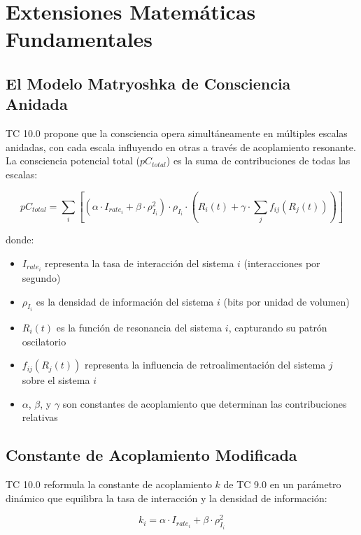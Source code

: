 \documentclass[12pt]{article}
\begin{document}
\section{Extensiones Matemáticas Fundamentales}

\subsection{El Modelo Matryoshka de Consciencia Anidada}

TC 10.0 propone que la consciencia opera simultáneamente en múltiples escalas anidadas, con cada escala influyendo en otras a través de acoplamiento resonante. La consciencia potencial total ($pC_{total}$) es la suma de contribuciones de todas las escalas:

\begin{equation}
pC_{total} = \sum_{i} [(\alpha \cdot I_{rate_i} + \beta \cdot \rho_{I_i}^2) \cdot \rho_{I_i} \cdot (R_i(t) + \gamma \cdot \sum_{j} f_{ij}(R_j(t)))]
\end{equation}

donde:
\begin{itemize}
    \item $I_{rate_i}$ representa la tasa de interacción del sistema $i$ (interacciones por segundo)
    \item $\rho_{I_i}$ es la densidad de información del sistema $i$ (bits por unidad de volumen)
    \item $R_i(t)$ es la función de resonancia del sistema $i$, capturando su patrón oscilatorio
    \item $f_{ij}(R_j(t))$ representa la influencia de retroalimentación del sistema $j$ sobre el sistema $i$
    \item $\alpha$, $\beta$, y $\gamma$ son constantes de acoplamiento que determinan las contribuciones relativas
\end{itemize}

\subsection{Constante de Acoplamiento Modificada}

TC 10.0 reformula la constante de acoplamiento $k$ de TC 9.0 en un parámetro dinámico que equilibra la tasa de interacción y la densidad de información:

\begin{equation}
k_i = \alpha \cdot I_{rate_i} + \beta \cdot \rho_{I_i}^2
\end{equation}
\end{document}
